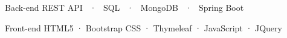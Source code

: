 
\begin{cvskills}
  \cvskill
    {Back-end} %
    {REST API ~·~ SQL ~·~ MongoDB ~·~ Spring Boot} %

  \cvskill
    {Front-end} %
    {HTML5 · Bootstrap CSS · Thymeleaf · JavaScript · JQuery} %

\end{cvskills}